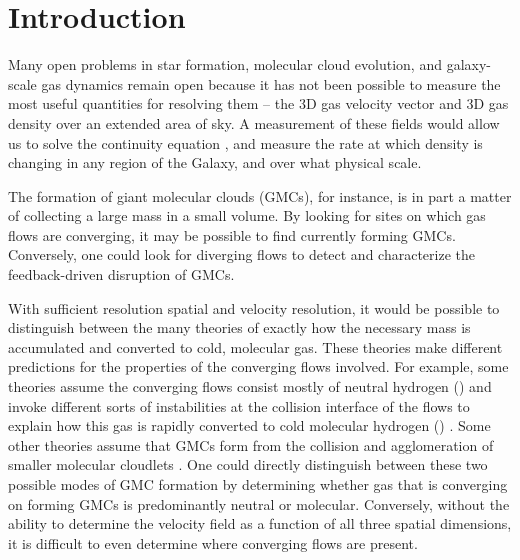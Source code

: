 \section{Introduction}
Many open problems in star formation, molecular cloud evolution, and galaxy-scale gas dynamics remain open because it has not been possible to measure the most useful quantities for resolving them -- the 3D gas velocity vector and 3D gas density over an extended area of sky. A measurement of these fields would allow us to solve the continuity equation \cite{euler1757principes}, and measure the rate at which density is changing in any region of the Galaxy, and over what physical scale. 

The formation of giant molecular clouds (GMCs), for instance, is in part a matter of collecting a large mass in a small volume. 
By looking for sites on which gas flows are converging, it may be possible to find currently forming GMCs.
Conversely, one could look for diverging flows to detect and characterize the feedback-driven disruption of GMCs.

With sufficient resolution spatial and velocity resolution, it would be possible to distinguish between the many theories of exactly how the necessary mass is accumulated and converted to cold, molecular gas. 
These theories make different predictions for the properties of the converging flows involved. 
For example, some theories assume the converging flows consist mostly of neutral hydrogen (\atomH) and invoke different sorts of instabilities at the collision interface of the flows to explain how this gas is rapidly converted to cold molecular hydrogen (\molH) \citep[e.g. ][]{Heitsch06,Clark:2012bq,2014ApJ...790...37C}.
Some other theories assume that GMCs form from the collision and agglomeration of smaller molecular cloudlets \citep[e.g. ][]{Roberts:1987eb,Dobbs:2008ez,Tasker:2009gc}. 
One could directly distinguish between these two possible modes of GMC formation by determining whether gas that is converging on forming GMCs is predominantly neutral or molecular.
Conversely, without the ability to determine the velocity field as a function of all three spatial dimensions, it is difficult to even determine where converging flows are present.

